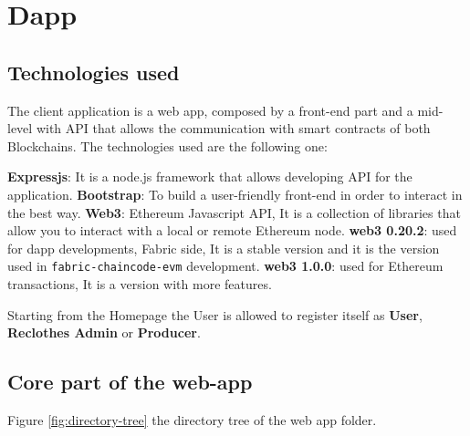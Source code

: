 \newpage
\section{Dapp}

\subsection{Technologies used}

The client application is a web app, composed by a front-end part and a mid-level with API that allows
the communication with smart contracts of both Blockchains. The technologies used are the following one:

\begin{outline}
    \1 \textbf{Expressjs}: It is a node.js framework that allows developing API for the application.
    \1 \textbf{Bootstrap}: To build a user-friendly front-end in order to interact in the best way.
    \1 \textbf{Web3}: Ethereum Javascript API, It is a collection of libraries that allow you to interact with a 
    local or remote Ethereum node. 
    \2 \textbf{web3 0.20.2}: used for dapp developments, Fabric side, It is a stable version and it is the version
    used in \texttt{fabric-chaincode-evm} development.
    \2 \textbf{web3 1.0.0}: used for Ethereum transactions, It is a version with more features.
\end{outline}

Starting from the Homepage the User is allowed to register itself as \textbf{User}, \textbf{Reclothes Admin}
or \textbf{Producer}.

\subsection{Core part of the web-app}

Figure \ref{fig:directory-tree} the directory tree of the web app folder. 

